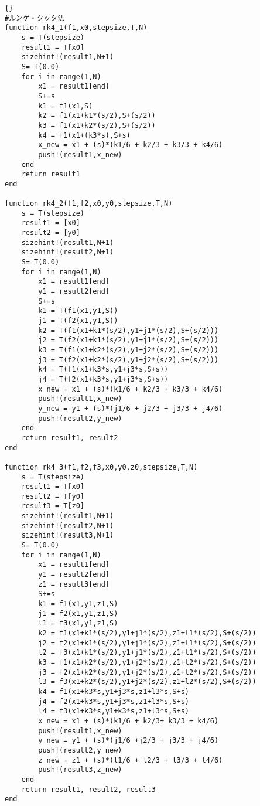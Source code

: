 \begin{lstlisting}[caption =\text{numerical\_scheme.jl}, label =code_numericalscheme]{}
#ルンゲ・クッタ法
function rk4_1(f1,x0,stepsize,T,N)
    s = T(stepsize)
    result1 = T[x0]
    sizehint!(result1,N+1)
    S= T(0.0)
    for i in range(1,N)
        x1 = result1[end]
        S+=s
        k1 = f1(x1,S)
        k2 = f1(x1+k1*(s/2),S+(s/2))
        k3 = f1(x1+k2*(s/2),S+(s/2))
        k4 = f1(x1+(k3*s),S+s)
        x_new = x1 + (s)*(k1/6 + k2/3 + k3/3 + k4/6)
        push!(result1,x_new)
    end
    return result1
end

function rk4_2(f1,f2,x0,y0,stepsize,T,N)
    s = T(stepsize)
    result1 = [x0]
    result2 = [y0]
    sizehint!(result1,N+1)
    sizehint!(result2,N+1)
    S= T(0.0)
    for i in range(1,N)
        x1 = result1[end]
        y1 = result2[end]
        S+=s
        k1 = T(f1(x1,y1,S))
        j1 = T(f2(x1,y1,S))
        k2 = T(f1(x1+k1*(s/2),y1+j1*(s/2),S+(s/2)))
        j2 = T(f2(x1+k1*(s/2),y1+j1*(s/2),S+(s/2)))
        k3 = T(f1(x1+k2*(s/2),y1+j2*(s/2),S+(s/2)))
        j3 = T(f2(x1+k2*(s/2),y1+j2*(s/2),S+(s/2)))
        k4 = T(f1(x1+k3*s,y1+j3*s,S+s))
        j4 = T(f2(x1+k3*s,y1+j3*s,S+s))
        x_new = x1 + (s)*(k1/6 + k2/3 + k3/3 + k4/6)
        push!(result1,x_new)
        y_new = y1 + (s)*(j1/6 + j2/3 + j3/3 + j4/6)
        push!(result2,y_new)
    end
    return result1, result2
end

function rk4_3(f1,f2,f3,x0,y0,z0,stepsize,T,N)
    s = T(stepsize)
    result1 = T[x0]
    result2 = T[y0]
    result3 = T[z0]
    sizehint!(result1,N+1)
    sizehint!(result2,N+1)
    sizehint!(result3,N+1)
    S= T(0.0)
    for i in range(1,N)
        x1 = result1[end]
        y1 = result2[end]
        z1 = result3[end]
        S+=s
        k1 = f1(x1,y1,z1,S)
        j1 = f2(x1,y1,z1,S)
        l1 = f3(x1,y1,z1,S)
        k2 = f1(x1+k1*(s/2),y1+j1*(s/2),z1+l1*(s/2),S+(s/2))
        j2 = f2(x1+k1*(s/2),y1+j1*(s/2),z1+l1*(s/2),S+(s/2))
        l2 = f3(x1+k1*(s/2),y1+j1*(s/2),z1+l1*(s/2),S+(s/2))
        k3 = f1(x1+k2*(s/2),y1+j2*(s/2),z1+l2*(s/2),S+(s/2))
        j3 = f2(x1+k2*(s/2),y1+j2*(s/2),z1+l2*(s/2),S+(s/2))
        l3 = f3(x1+k2*(s/2),y1+j2*(s/2),z1+l2*(s/2),S+(s/2))
        k4 = f1(x1+k3*s,y1+j3*s,z1+l3*s,S+s)
        j4 = f2(x1+k3*s,y1+j3*s,z1+l3*s,S+s)
        l4 = f3(x1+k3*s,y1+k3*s,z1+l3*s,S+s)
        x_new = x1 + (s)*(k1/6 + k2/3+ k3/3 + k4/6)
        push!(result1,x_new)
        y_new = y1 + (s)*(j1/6 +j2/3 + j3/3 + j4/6)
        push!(result2,y_new)
        z_new = z1 + (s)*(l1/6 + l2/3 + l3/3 + l4/6)
        push!(result3,z_new)
    end
    return result1, result2, result3
end
\end{lstlisting}

